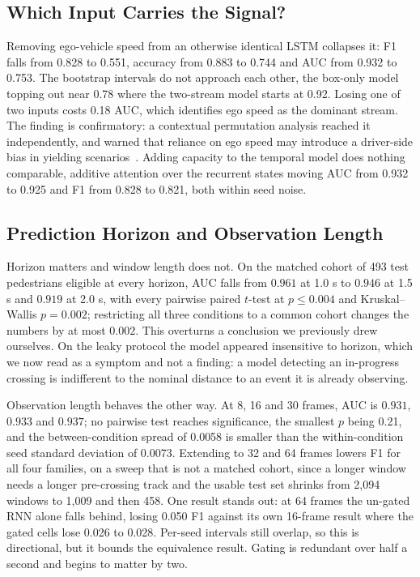 \documentclass[mti,article,submit,moreauthors]{Definitions/mdpi}
\begin{document}
\subsection{Which Input Carries the Signal?}

Removing ego-vehicle speed from an otherwise identical LSTM collapses it: F1 falls from 0.828 to 0.551, accuracy from 0.883 to 0.744 and AUC from 0.932 to 0.753. The bootstrap intervals do not approach each other, the box-only model topping out near 0.78 where the two-stream model starts at 0.92. Losing one of two inputs costs 0.18 AUC, which identifies ego speed as the dominant stream. The finding is confirmatory: a contextual permutation analysis reached it independently, and warned that reliance on ego speed may introduce a driver-side bias in yielding scenarios~\citep{azarmi2024featureimportance}. Adding capacity to the temporal model does nothing comparable, additive attention over the recurrent states moving AUC from 0.932 to 0.925 and F1 from 0.828 to 0.821, both within seed noise.

\subsection{Prediction Horizon and Observation Length}
\label{sec:horizon}

Horizon matters and window length does not. On the matched cohort of 493 test pedestrians eligible at every horizon, AUC falls from $0.961$ at 1.0 s to $0.946$ at 1.5 s and $0.919$ at 2.0 s, with every pairwise paired $t$-test at $p \le 0.004$ and Kruskal--Wallis $p = 0.002$; restricting all three conditions to a common cohort changes the numbers by at most 0.002. This overturns a conclusion we previously drew ourselves. On the leaky protocol the model appeared insensitive to horizon, which we now read as a symptom and not a finding: a model detecting an in-progress crossing is indifferent to the nominal distance to an event it is already observing.

Observation length behaves the other way. At 8, 16 and 30 frames, AUC is $0.931$, $0.933$ and $0.937$; no pairwise test reaches significance, the smallest $p$ being 0.21, and the between-condition spread of 0.0058 is smaller than the within-condition seed standard deviation of 0.0073. Extending to 32 and 64 frames lowers F1 for all four families, on a sweep that is not a matched cohort, since a longer window needs a longer pre-crossing track and the usable test set shrinks from 2,094 windows to 1,009 and then 458. One result stands out: at 64 frames the un-gated RNN alone falls behind, losing 0.050 F1 against its own 16-frame result where the gated cells lose 0.026 to 0.028. Per-seed intervals still overlap, so this is directional, but it bounds the equivalence result. Gating is redundant over half a second and begins to matter by two.
\end{document}
